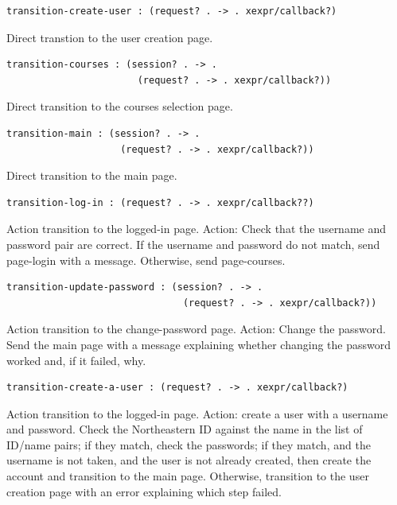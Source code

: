 \documentclass[a4paper]{article}
\begin{document}
\begin{verbatim}
transition-create-user : (request? . -> . xexpr/callback?)
\end{verbatim}
Direct transtion to the user creation page.

\begin{verbatim}
transition-courses : (session? . -> .
                       (request? . -> . xexpr/callback?))
\end{verbatim}
Direct transition to the courses selection page.

\begin{verbatim}
transition-main : (session? . -> .
                    (request? . -> . xexpr/callback?))
\end{verbatim}
Direct transition to the main page.



\begin{verbatim}
transition-log-in : (request? . -> . xexpr/callback??)
\end{verbatim}
Action transition to the logged-in page.
Action: Check that the username and password pair are correct.
If the username and password do not match, send page-login with a message.
Otherwise, send page-courses.

\begin{verbatim}
transition-update-password : (session? . -> .
                               (request? . -> . xexpr/callback?))
\end{verbatim}
Action transition to the change-password page.
Action: Change the password.
Send the main page with a message explaining whether changing the password
worked and, if it failed, why.

\begin{verbatim}
transition-create-a-user : (request? . -> . xexpr/callback?)
\end{verbatim}
Action transition to the logged-in page.
Action: create a user with a username and password.
Check the Northeastern ID against the name in the list of
ID/name pairs; if they match, check the passwords; if they
match, and the username is not taken, and the user is not
already created, then create the account and transition to
the main page. Otherwise, transition to the user
creation page with an error explaining which step failed.
\end{document}
